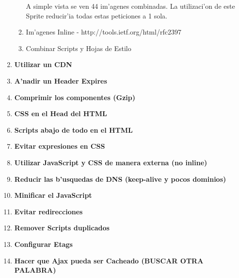 \begin{enumerate}
\begin{enumerate}
	A simple vista se ven 44 im'agenes combinadas. La utilizaci'on de este Sprite reducir'ia todas estas peticiones a 1 sola.
	\item Im'agenes Inline - http://tools.ietf.org/html/rfc2397
	\item Combinar Scripts y Hojas de Estilo
	\end{enumerate}	
\item \textbf{Utilizar un CDN}
\item \textbf{A'nadir un Header Expires}
\item \textbf{Comprimir los componentes (Gzip)}
\item \textbf{CSS en el Head del HTML}
\item \textbf{Scripts abajo de todo en el HTML}
\item \textbf{Evitar expresiones en CSS}
\item \textbf{Utilizar JavaScript y CSS de manera externa (no inline)}
\item \textbf{Reducir las b'usquedas de DNS (keep-alive y pocos dominios)}
\item \textbf{Minificar el JavaScript}
\item \textbf{Evitar redirecciones}
\item \textbf{Remover Scripts duplicados}
\item \textbf{Configurar Etags}
\item \textbf{Hacer que Ajax pueda ser Cacheado (BUSCAR OTRA PALABRA)}

\end{enumerate}